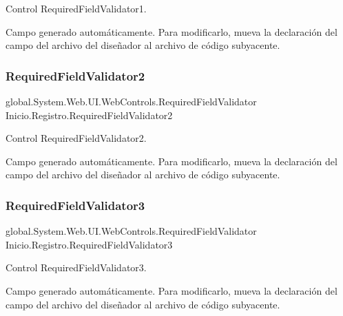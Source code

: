 Control Required\+Field\+Validator1. 

Campo generado automáticamente. Para modificarlo, mueva la declaración del campo del archivo del diseñador al archivo de código subyacente. \mbox{\label{classInicio_1_1Registro_a315fe7dd04ad883d4acd03f25fb7c1e9}} 
\subsubsection{\texorpdfstring{RequiredFieldValidator2}{RequiredFieldValidator2}}
{\footnotesize\ttfamily global.\+System.\+Web.\+U\+I.\+Web\+Controls.\+Required\+Field\+Validator Inicio.\+Registro.\+Required\+Field\+Validator2\hspace{0.3cm}{\ttfamily [protected]}}



Control Required\+Field\+Validator2. 

Campo generado automáticamente. Para modificarlo, mueva la declaración del campo del archivo del diseñador al archivo de código subyacente. \mbox{\label{classInicio_1_1Registro_a24b35dd88cea1b27e18e681d9f1bd24a}} 
\subsubsection{\texorpdfstring{RequiredFieldValidator3}{RequiredFieldValidator3}}
{\footnotesize\ttfamily global.\+System.\+Web.\+U\+I.\+Web\+Controls.\+Required\+Field\+Validator Inicio.\+Registro.\+Required\+Field\+Validator3\hspace{0.3cm}{\ttfamily [protected]}}



Control Required\+Field\+Validator3. 

Campo generado automáticamente. Para modificarlo, mueva la declaración del campo del archivo del diseñador al archivo de código subyacente. \mbox{\label{classInicio_1_1Registro_a50ab8ab72bcd7c32903c8af8acb766ea}} 

